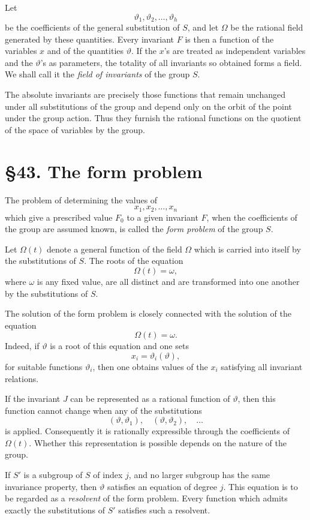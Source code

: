 \documentclass[11pt,a4paper]{book}
\newcommand{\webersection}[2]{\clearpage\section*{\S #1. #2}}
\begin{document}
Let
\[
\vartheta_1,\vartheta_2,\ldots,\vartheta_h
\]
be the coefficients of the general substitution of \(S\), and let \(\Omega\) be the rational field generated by these quantities.  Every invariant \(F\) is then a function of the variables \(x\) and of the quantities \(\vartheta\).  If the \(x\)'s are treated as independent variables and the \(\vartheta\)'s as parameters, the totality of all invariants so obtained forms a field.  We shall call it the \emph{field of invariants} of the group \(S\).

The absolute invariants are precisely those functions that remain unchanged under all substitutions of the group and depend only on the orbit of the point under the group action.  Thus they furnish the rational functions on the quotient of the space of variables by the group.

\webersection{43}{The form problem}

The problem of determining the values of
\[
x_1,x_2,\ldots,x_n
\]
which give a prescribed value \(F_0\) to a given invariant \(F\), when the coefficients of the group are assumed known, is called the \emph{form problem} of the group \(S\).

Let \(\Omega(t)\) denote a general function of the field \(\Omega\) which is carried into itself by the substitutions of \(S\).  The roots of the equation
\[
\Omega(t)=\omega,
\]
where \(\omega\) is any fixed value, are all distinct and are transformed into one another by the substitutions of \(S\).

The solution of the form problem is closely connected with the solution of the equation
\[
\Omega(t)=\omega.
\]
Indeed, if \(\vartheta\) is a root of this equation and one sets
\begin{equation}
x_i=\vartheta_i(\vartheta),
\end{equation}
for suitable functions \(\vartheta_i\), then one obtains values of the \(x_i\) satisfying all invariant relations.

If the invariant \(J\) can be represented as a rational function of \(\vartheta\), then this function cannot change when any of the substitutions
\[
(\vartheta,\vartheta_1),\quad
(\vartheta,\vartheta_2),\quad\ldots
\]
is applied.  Consequently it is rationally expressible through the coefficients of \(\Omega(t)\).  Whether this representation is possible depends on the nature of the group.

If \(S'\) is a subgroup of \(S\) of index \(j\), and no larger subgroup has the same invariance property, then \(\vartheta\) satisfies an equation of degree \(j\).  This equation is to be regarded as a \emph{resolvent} of the form problem.  Every function which admits exactly the substitutions of \(S'\) satisfies such a resolvent.
\end{document}
